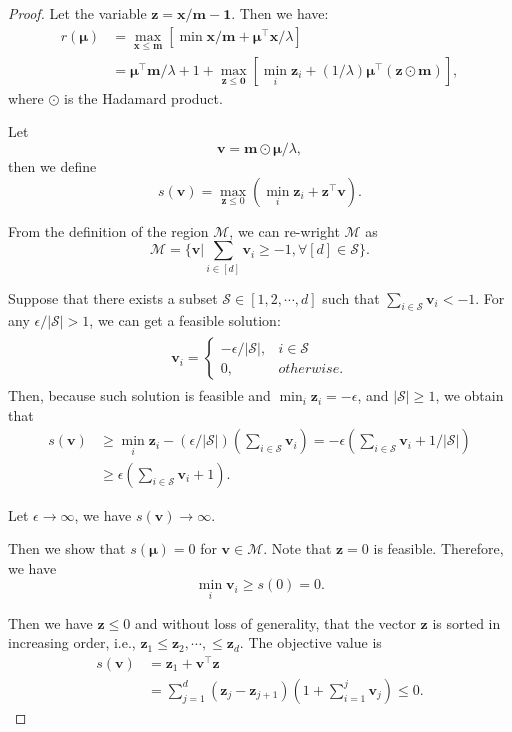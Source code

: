 \begin{proof}
    Let the variable $\bm{z} = \bm{x}/\bm{m}-\bm{1}$. Then we have:
\begin{align*}
    r(\bm{\mu}) &= \max_{\bm{x}\leq \bm{m}}\left[\min \bm{x}/\bm{m} + \bm{\mu}^{\top}\bm{x}/\lambda\right]\\
    &= \bm{\mu}^{\top}\bm{m} /\lambda +  1 + \max_{\bm{z} \leq \bm{0}}\left[\min_i \bm{z}_i + (1/\lambda) \bm{\mu}^{\top}(\bm{z}\odot\bm{m})\right],
\end{align*}
where $\odot$ is the Hadamard product.


Let 
\[
    \bm{v} = \bm{m}\odot\bm{\mu}/\lambda,
\]
then we define 
\[
    s(\bm{v}) = \max_{\bm{z}\leq 0}\left( \min_i \bm{z}_i + \bm{z}^{\top}\bm{v}\right).
\]

From the definition of the region $\mathcal{M}$, we can re-wright $\mathcal{M}$ as
\[
    \mathcal{M} = \{\bm{v}|\sum_{i\in [d]}\bm{v}_i \ge -1, \forall [d]\in \mathcal{S}\}.
\]

Suppose that there exists a subset $\mathcal{S}\in [1,2,\cdots, d]$ such that $\sum_{i\in\mathcal{S}} \mathbf{v}_i < -1$. For any $\epsilon/|\mathcal{S}| > 1$, we can get a feasible solution:
\begin{align*}
\begin{split}
\bm{v}_i= \left \{
\begin{array}{ll}
   -\epsilon/|\mathcal{S}|,                    & i\in \mathcal{S}\\
    0,                    & otherwise.
\end{array}
\right.
\end{split}
\end{align*}
Then, because such solution is feasible and $\min_i \bm{z}_i = -\epsilon$, and $|\mathcal{S}|\ge 1$, we obtain that 
\begin{align*}
    s(\bm{v}) &\ge \min_i \bm{z}_i - (\epsilon/|\mathcal{S}|)(\sum_{i\in\mathcal{S}}\bm{v}_i) = -\epsilon(\sum_{i\in\mathcal{S}}\bm{v}_i+1/|\mathcal{S}|)\\
    &\ge \epsilon(\sum_{i\in\mathcal{S}}\bm{v}_i+1).   
\end{align*}

Let $\epsilon\rightarrow\infty$, we have $s(\bm{v})\rightarrow\infty$.

Then we show that $s(\bm{\mu}) = 0$ for $\bm{v}\in\mathcal{M}$. Note that $\bm{z} = 0$ is feasible. Therefore, we have
\[
    \min_i \bm{v}_i \ge s(0) = 0.
\]

Then we have $\bm{z} \leq 0$ and without loss of generality, that the vector $\bm{z}$ is sorted in increasing order, i.e., $\bm{z}_1\leq \bm{z}_2, \cdots, \leq \bm{z}_d$.
The objective value is
\begin{align*}
     s(\bm{v}) &= \mathbf{z}_1 + \bm{v}^{\top}\bm{z} \\
     &= \sum_{j=1}^{d}\left(\bm{z}_j-\bm{z}_{j+1}\right)\left(1+\sum_{i=1}^{j}\bm{v}_j\right)\leq 0.
\end{align*}


\end{proof}
